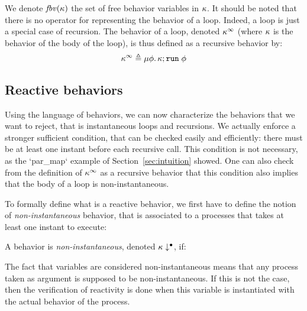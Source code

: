 \documentclass[9pt]{sigplanconf}
\newcommand{\deq}{\triangleq}
\begin{document}
We denote $\mathit{fbv}(\kappa)$ the set of free behavior variables in $\kappa$. It should be noted that there is no operator for representing the behavior of a loop. Indeed, a loop is just a special case of recursion. The behavior of a loop, denoted $\kappa^\infty$ (where $\kappa$ is the behavior of the body of the loop), is thus defined as a recursive behavior by:
\[\effinf{\rk} \deq \effrec{\effvar}{\effcon{\rk}{\effrun{\effvar}}} \]

%
%
%
%
%


\subsection{Reactive behaviors}
\label{sec:reactive_behavior}

Using the language of behaviors, we can now characterize the behaviors that we want to reject, that is instantaneous loops and recursions. We actually enforce a stronger sufficient condition, that can be checked easily and efficiently: there must be at least one instant before each recursive call. This condition is not necessary, as the `par_map` example of Section~\ref{sec:intuition} showed. One can also check from the definition of $\kappa^\infty$ as a recursive behavior that this condition also implies that the body of a loop is non-instantaneous.

To formally define what is a reactive behavior, we first have to define the notion of \emph{non-instantaneous} behavior, that is associated to a processes that takes at least one instant to execute:
\begin{definition}
A behavior is \emph{non-instantaneous}, denoted $\kappa\downarrow^{\bullet}$, if:

\end{definition}
The fact that variables are considered non-instantaneous means that any process taken as argument is supposed to be non-instantan\-eous. If this is not the case, then the verification of reactivity is done when this variable is instantiated with the actual behavior of the process.
\end{document}
